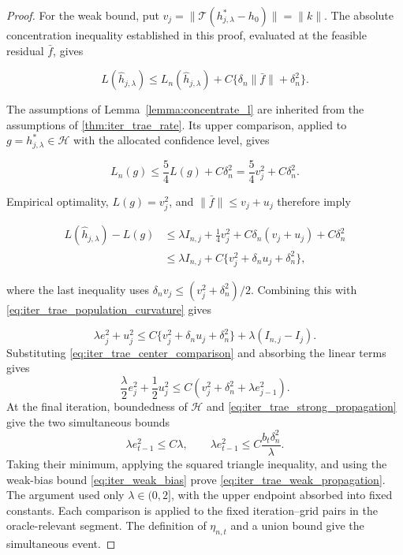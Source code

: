 \begin{proof}
For the weak bound, put $v_j=\|\mathcal T(h_{j,\lambda}^*-h_0)\|=\|k\|$. The absolute concentration inequality established in this proof, evaluated at the feasible residual $\bar f$, gives

\[
L(\hat h_{j,\lambda})
\leqslant L_n(\hat h_{j,\lambda})
+C\{\delta_n\|\bar f\|+\delta_n^2\}.
\]

The assumptions of Lemma~\ref{lemma:concentrate_l} are inherited from the assumptions of \cref{thm:iter_trae_rate}. Its upper comparison, applied to $g=h_{j,\lambda}^*\in\mathcal H$ with the allocated confidence level, gives

\[
L_n(g)\leqslant\frac54L(g)+C\delta_n^2
=\frac54v_j^2+C\delta_n^2.
\]

Empirical optimality, $L(g)=v_j^2$, and $\|\bar f\|\leqslant v_j+u_j$ therefore imply

\[
\begin{split}
L(\hat h_{j,\lambda})-L(g)
&\leqslant\lambda I_{n,j}+\frac14v_j^2
+C\delta_n(v_j+u_j)+C\delta_n^2\\
&\leqslant\lambda I_{n,j}+C\{v_j^2+\delta_nu_j+\delta_n^2\},
\end{split}
\]

where the last inequality uses $\delta_nv_j\leqslant(v_j^2+\delta_n^2)/2$. Combining this with \eqref{eq:iter_trae_population_curvature} gives

\[
\lambda e_j^2+u_j^2 \leqslant C\{v_j^2+\delta_nu_j+\delta_n^2\} +\lambda(I_{n,j}-I_j).
\]
Substituting \eqref{eq:iter_trae_center_comparison} and absorbing the linear terms gives
\[
\frac{\lambda}{2}e_j^2+\frac12u_j^2 \leqslant C\left(v_j^2+\delta_n^2+\lambda e_{j-1}^2\right).
\]
At the final iteration, boundedness of $\mathcal H$ and
\eqref{eq:iter_trae_strong_propagation} give the two simultaneous bounds
\[
\lambda e_{t-1}^2\leqslant C\lambda,
\qquad
\lambda e_{t-1}^2
\leqslant C\frac{b_t\delta_n^2}{\lambda}.
\]
Taking their minimum, applying the squared triangle inequality, and using the
weak-bias bound \eqref{eq:iter_weak_bias} prove
\eqref{eq:iter_trae_weak_propagation}. The argument used only
$\lambda\in(0,2]$, with the upper endpoint absorbed into fixed constants.
Each comparison is applied to the fixed iteration--grid pairs in the
oracle-relevant segment.
The definition of $\eta_{n,t}$ and a union bound give the simultaneous event.
\end{proof}

